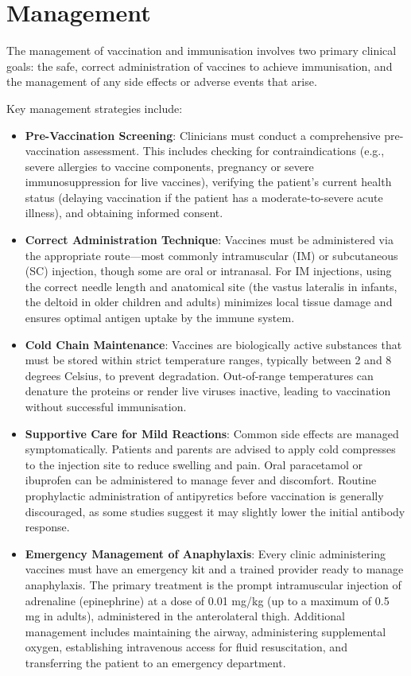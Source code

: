 \section*{Management}
The management of vaccination and immunisation involves two primary clinical goals: the safe, correct administration of vaccines to achieve immunisation, and the management of any side effects or adverse events that arise.

Key management strategies include:
\begin{itemize}
    \item \textbf{Pre-Vaccination Screening}: Clinicians must conduct a comprehensive pre-vaccination assessment. This includes checking for contraindications (e.g., severe allergies to vaccine components, pregnancy or severe immunosuppression for live vaccines), verifying the patient's current health status (delaying vaccination if the patient has a moderate-to-severe acute illness), and obtaining informed consent.
    \item \textbf{Correct Administration Technique}: Vaccines must be administered via the appropriate route—most commonly intramuscular (IM) or subcutaneous (SC) injection, though some are oral or intranasal. For IM injections, using the correct needle length and anatomical site (the vastus lateralis in infants, the deltoid in older children and adults) minimizes local tissue damage and ensures optimal antigen uptake by the immune system.
    \item \textbf{Cold Chain Maintenance}: Vaccines are biologically active substances that must be stored within strict temperature ranges, typically between 2 and 8 degrees Celsius, to prevent degradation. Out-of-range temperatures can denature the proteins or render live viruses inactive, leading to vaccination without successful immunisation.
    \item \textbf{Supportive Care for Mild Reactions}: Common side effects are managed symptomatically. Patients and parents are advised to apply cold compresses to the injection site to reduce swelling and pain. Oral paracetamol or ibuprofen can be administered to manage fever and discomfort. Routine prophylactic administration of antipyretics before vaccination is generally discouraged, as some studies suggest it may slightly lower the initial antibody response.
    \item \textbf{Emergency Management of Anaphylaxis}: Every clinic administering vaccines must have an emergency kit and a trained provider ready to manage anaphylaxis. The primary treatment is the prompt intramuscular injection of adrenaline (epinephrine) at a dose of 0.01 mg/kg (up to a maximum of 0.5 mg in adults), administered in the anterolateral thigh. Additional management includes maintaining the airway, administering supplemental oxygen, establishing intravenous access for fluid resuscitation, and transferring the patient to an emergency department.
\end{itemize}

